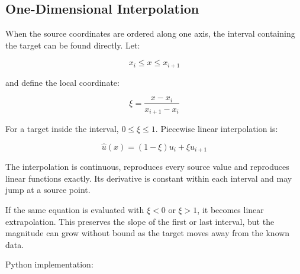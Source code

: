 \subsection{One-Dimensional Interpolation}

When the source coordinates are ordered along one axis, the interval containing
the target can be found directly. Let:

\begin{equation}
    x_i \leq x \leq x_{i+1}
\end{equation}

and define the local coordinate:

\begin{equation}
    \xi = \frac{x-x_i}{x_{i+1}-x_i}
\end{equation}

For a target inside the interval, $ 0\leq\xi\leq1 $. Piecewise linear
interpolation is:

\begin{equation}
    \widehat{u}(x) = (1-\xi)u_i + \xi u_{i+1}
\end{equation}

The interpolation is continuous, reproduces every source value and reproduces
linear functions exactly. Its derivative is constant within each interval and
may jump at a source point.

If the same equation is evaluated with $ \xi<0 $ or $ \xi>1 $, it becomes
linear extrapolation. This preserves the slope of the first or last interval,
but the magnitude can grow without bound as the target moves away from the
known data.

Python implementation:

